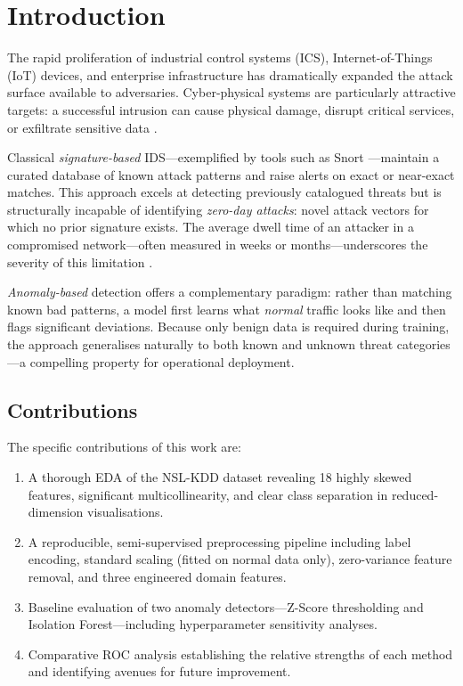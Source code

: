 \documentclass[conference]{IEEEtran}
\begin{document}
\section{Introduction}
\label{sec:intro}

The rapid proliferation of industrial control systems (ICS), Internet-of-Things
(IoT) devices, and enterprise infrastructure has dramatically expanded the
attack surface available to adversaries.  Cyber-physical systems are particularly
attractive targets: a successful intrusion can cause physical damage, disrupt
critical services, or exfiltrate sensitive data \cite{chandola2009}.

Classical \emph{signature-based} IDS---exemplified by tools such as Snort
\cite{roesch1999}---maintain a curated database of known attack patterns and raise
alerts on exact or near-exact matches.  This approach excels at detecting
previously catalogued threats but is structurally incapable of identifying
\emph{zero-day attacks}: novel attack vectors for which no prior signature exists.
The average dwell time of an attacker in a compromised network---often measured in
weeks or months---underscores the severity of this limitation \cite{chandola2009}.

\emph{Anomaly-based} detection offers a complementary paradigm: rather than
matching known bad patterns, a model first learns what \emph{normal} traffic looks
like and then flags significant deviations.  Because only benign data is required
during training, the approach generalises naturally to both known and unknown threat
categories---a compelling property for operational deployment.

\subsection{Contributions}
The specific contributions of this work are:
\begin{enumerate}
  \item A thorough EDA of the NSL-KDD dataset revealing 18 highly skewed features,
        significant multicollinearity, and clear class separation in reduced-dimension
        visualisations.
  \item A reproducible, semi-supervised preprocessing pipeline including label
        encoding, standard scaling (fitted on normal data only), zero-variance feature
        removal, and three engineered domain features.
  \item Baseline evaluation of two anomaly detectors---Z-Score thresholding and
        Isolation Forest---including hyperparameter sensitivity analyses.
  \item Comparative ROC analysis establishing the relative strengths of each method
        and identifying avenues for future improvement.
\end{enumerate}
\end{document}

